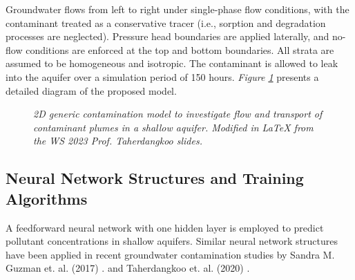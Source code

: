 \documentclass[10pt]{article}
\begin{document}
	Groundwater flows from left to right under single-phase flow conditions, with the contaminant treated as a conservative tracer (i.e., sorption and degradation processes are neglected). Pressure head boundaries are applied laterally, and no-flow conditions are enforced at the top and bottom boundaries. All strata are assumed to be homogeneous and isotropic.
	The contaminant is allowed to leak into the aquifer over a simulation period of 150 hours. \textit{Figure \ref{fig:contamination_model}} presents a detailed diagram of the proposed model.
	
	\begin{figure}[h]
		\centering
		\caption{\textit{2D generic contamination model to investigate flow and transport of contaminant plumes in a shallow aquifer. Modified in \LaTeX{} from the WS 2023 Prof. Taherdangkoo slides.}}
		\label{fig:contamination_model}
	\end{figure}
	
	\subsection{Neural Network Structures and Training Algorithms}
	
	A feedforward neural network with one hidden layer is employed to predict pollutant concentrations in shallow aquifers. Similar neural network structures have been applied in recent groundwater contamination studies by Sandra M. Guzman et. al. (2017) \cite{guzman2017}. and Taherdangkoo et. al. (2020) \cite{taherdangkoo2020}.
	
\end{document}
